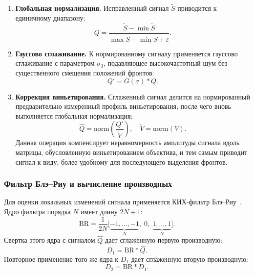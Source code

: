 \begin{enumerate}
    \item \textbf{Глобальная нормализация.} Исправленный сигнал $\tilde S$ приводится к единичному диапазону:
    \begin{equation}
        Q = \frac{\tilde S - \min \tilde S}{\max \tilde S - \min \tilde S + \varepsilon}.
    \end{equation}

    \item \textbf{Гауссово сглаживание.} К нормированному сигналу применяется гауссово сглаживание с параметром $\sigma_3$, подавляющее высокочастотный шум без существенного смещения положений фронтов:
    \begin{equation}
        Q' = G(\sigma) * Q.
    \end{equation}

    \item \textbf{Коррекция виньетирования.} Сглаженный сигнал делится на нормированный предварительно измеренный профиль виньетирования, после чего вновь выполняется глобальная нормализация:
    \begin{equation}
        \hat Q = \mathrm{norm}\!\left(\frac{Q'}{\tilde V}\right),
        \quad
        \tilde V = \mathrm{norm}(V).
    \end{equation}
    Данная операция компенсирует неравномерность амплитуды сигнала вдоль матрицы, обусловленную виньетированием объектива, и тем самым приводит сигнал к виду, более удобному для последующего выделения фронтов.
\end{enumerate}

\subsubsection{Фильтр Блэ--Риу и вычисление производных}

Для оценки локальных изменений сигнала применяется КИХ-фильтр Блэ--Риу~\cite{blais_rioux_peak}. Ядро фильтра порядка $N$ имеет длину $2N+1$:
\begin{equation}
    \mathrm{BR} = \frac{1}{2N}\bigl[\underbrace{-1,\ldots,-1}_{N},\;0,\;\underbrace{1,\ldots,1}_{N}\bigr].
\end{equation}
Свертка этого ядра с сигналом $\hat Q$ дает сглаженную первую производную:
\begin{equation}
    D_1 = \mathrm{BR} * \hat Q.
\end{equation}
Повторное применение того же ядра к $D_1$ дает сглаженную вторую производную:
\begin{equation}
    D_2 = \mathrm{BR} * D_1.
\end{equation}

